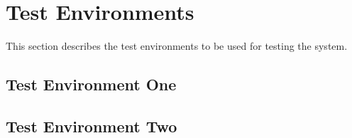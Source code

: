 
\chapter{Test Environments}
\label{loc:TestEnvironments}


This section describes the test environments to be used for testing the system.

\section{Test Environment One}
\label{loc:TestEnvironmentOne}
\newcommand{\TestEnvName}{TEone}%


\DIDINFOOFF%

\section{Test Environment Two}
\label{loc:TestEnvironmentTwo}
\renewcommand{\TestEnvName}{TEtwo}%


\DIDINFOON%


